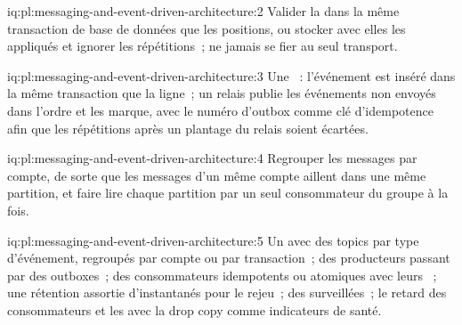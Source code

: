 \begin{solution}{iq:pl:messaging-and-event-driven-architecture:2}
Valider la  dans la même transaction de base de données que les positions, ou stocker avec elles les  appliqués et ignorer les répétitions~; ne jamais se
fier au seul transport.
\end{solution}

\begin{solution}{iq:pl:messaging-and-event-driven-architecture:3}
Une ~: l'événement est inséré dans la même transaction que la ligne~; un relais publie les événements non envoyés dans l'ordre et les marque,
avec le numéro d'outbox comme clé d'idempotence afin que les répétitions après un plantage du relais soient écartées.
\end{solution}

\begin{solution}{iq:pl:messaging-and-event-driven-architecture:4}
Regrouper les messages par compte, de sorte que les messages d'un même compte aillent dans une même partition, et faire lire chaque partition par un seul consommateur du groupe
à la fois.
\end{solution}

\begin{solution}{iq:pl:messaging-and-event-driven-architecture:5}
Un  avec des topics par type d'événement, regroupés par compte ou par transaction~; des producteurs passant par des outboxes~; des consommateurs idempotents ou atomiques avec
leurs ~; une rétention assortie d'instantanés pour le rejeu~; des  surveillées~; le retard des consommateurs et les  avec la drop copy comme
indicateurs de santé.
\end{solution}
